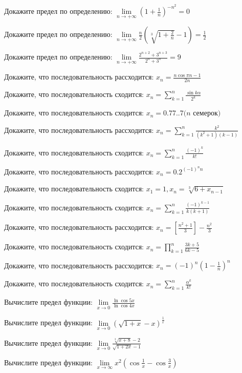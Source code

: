 \documentclass[russian]{article}
\begin{document}
Докажите предел по определению:
$\lim\limits_{n \to +\infty} \left(1 + \frac{1}{n}\right)^{-n^2} = 0$

Докажите предел по определению:
$\lim\limits_{n \to +\infty} \frac{n}{2}\left(\sqrt[3]{1 + \frac{2}{n}} - 1\right) = \frac{1}{2}$

Докажите предел по определению:
$\lim\limits_{n \to +\infty} \frac{2^{n + 2} + 3^{n + 3}}{2^n + 3^n} = 9$




Докажите, что последовательность рассходится:
$x_n = \frac{n \cos\pi n - 1}{2n}$

Докажите, что последовательность сходится:
$x_n = \sum_{k = 1}^n \frac{\sin k \alpha}{2^k}$

Докажите, что последовательность сходится:
$x_n = 0.77..7 \text{($n$ семерок)}$

Докажите, что последовательность рассходится:
$x_n = \sum_{k = 1}^n \frac{k^2}{(k^2 + 1)(k - 1)}$

Докажите, что последовательность сходится:
$x_n = \sum_{k = 1}^n \frac{(-1)^k}{k!}$

Докажите, что последовательность рассходится:
$x_n = 0.2^{(-1)^n n}$

Докажите, что последовательность сходится:
$x_1 = 1, x_n = \sqrt[3]{6 + x_{n - 1}}$

Докажите, что последовательность сходится:
$x_n = \sum_{k = 1}^n \frac{(-1)^{k - 1}}{k(k + 1)}$

Докажите, что последовательность рассходится:
$x_n = \left[\frac{n^2 + 1}{3}\right] - \frac{n^2}{3}$



Докажите, что последовательность сходится:
$x_n = \prod_{k = 1}^n \frac{3k + 5}{6k - 5}$

Докажите, что последовательность рассходится:
$x_n = (-1)^n\left(1 - \frac{1}{n}\right)^n$

Докажите, что последовательность сходится:
$x_n = \sum_{k = 1}^n \frac{\alpha^k}{k!}$




Вычислите предел функции:
$\lim\limits_{x \to 0} \frac{\ln\cos 5x}{\ln\cos 4x}$

Вычислите предел функции:
$\lim\limits_{x \to 0} (\sqrt{1 + x} - x)^\frac{1}{x}$

Вычислите предел функции:
$\lim\limits_{x \to 0} \frac{\sqrt[3]{x + 8} - 2}{\sqrt{1 + 2x} - 1}$

Вычислите предел функции:
$\lim\limits_{x \to \infty} x^2\left(\cos\frac{1}{x} - \cos\frac{3}{x}\right)$
\end{document}
